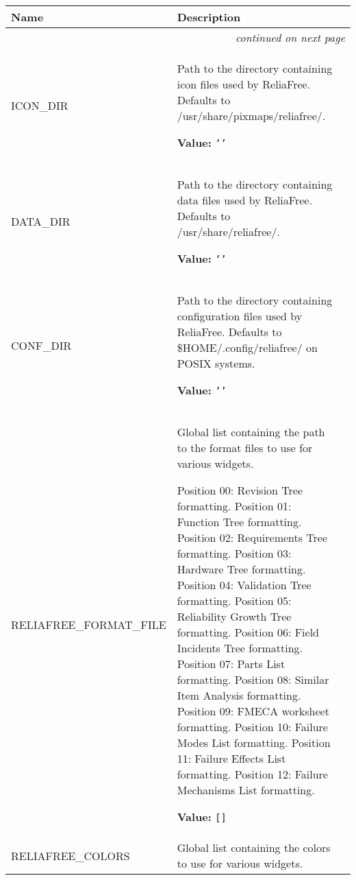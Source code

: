     \vspace{-1cm}
\hspace{\varindent}\begin{longtable}{|p{\varnamewidth}|p{\vardescrwidth}|l}
\cline{1-2}
\cline{1-2} \centering \textbf{Name} & \centering \textbf{Description}& \\
\cline{1-2}
\endhead\cline{1-2}\multicolumn{3}{r}{\small\textit{continued on next page}}\\\endfoot\cline{1-2}
\endlastfoot\raggedright I\-C\-O\-N\-\_\-D\-I\-R\- & \raggedright Path to the directory containing icon files used by ReliaFree.  
          Defaults to /usr/share/pixmaps/reliafree/.

\textbf{Value:} 
{\tt \texttt{'}\texttt{}\texttt{'}}&\\
\cline{1-2}
\raggedright D\-A\-T\-A\-\_\-D\-I\-R\- & \raggedright Path to the directory containing data files used by ReliaFree.  
          Defaults to /usr/share/reliafree/.

\textbf{Value:} 
{\tt \texttt{'}\texttt{}\texttt{'}}&\\
\cline{1-2}
\raggedright C\-O\-N\-F\-\_\-D\-I\-R\- & \raggedright Path to the directory containing configuration files used by 
          ReliaFree. Defaults to \$HOME/.config/reliafree/ on POSIX 
          systems.

\textbf{Value:} 
{\tt \texttt{'}\texttt{}\texttt{'}}&\\
\cline{1-2}
\raggedright R\-E\-L\-I\-A\-F\-R\-E\-E\-\_\-F\-O\-R\-M\-A\-T\-\_\-F\-I\-L\-E\- & \raggedright Global list containing the path to the format files to use for 
          various widgets.

          Position 00: Revision Tree formatting. Position 01: Function Tree
          formatting. Position 02: Requirements Tree formatting. Position 
          03: Hardware Tree formatting. Position 04: Validation Tree 
          formatting. Position 05: Reliability Growth Tree formatting. 
          Position 06: Field Incidents Tree formatting. Position 07: Parts 
          List formatting. Position 08: Similar Item Analysis formatting. 
          Position 09: FMECA worksheet formatting. Position 10: Failure 
          Modes List formatting. Position 11: Failure Effects List 
          formatting. Position 12: Failure Mechanisms List formatting.

\textbf{Value:} 
{\tt \texttt{[}\texttt{]}}&\\
\cline{1-2}
\raggedright R\-E\-L\-I\-A\-F\-R\-E\-E\-\_\-C\-O\-L\-O\-R\-S\- & \raggedright Global list containing the colors to use for various widgets.


\end{longtable}
